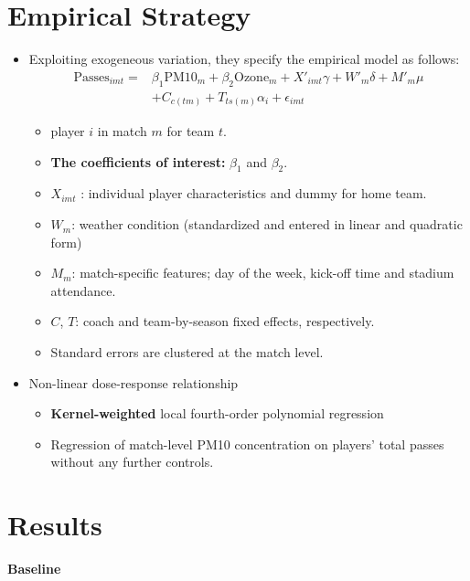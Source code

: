 \documentclass[../root]{subfiles}
\begin{document}
    \section{Empirical Strategy}

    \begin{itemize}
      \item Exploiting exogeneous variation, they specify the empirical model as follows:
      \begin{align*}
        \text{Passes}_{imt} = & \beta_1 \text{PM10}_m + \beta_2 \text{Ozone}_m + X'_{imt}\gamma + W'_m \delta + M'_m \mu \\
        & + C_{c(tm)} + T_{ts(m)} \alpha_i + \epsilon_{imt}
      \end{align*}
      \begin{itemize}
        \item player $i$ in match $m$ for team $t$.
        \item \textbf{The coefficients of interest:} $\beta_1$ and $\beta_2$.
        \item $X_{imt}$ : individual player characteristics and dummy for home team.
        \item $W_m$: weather condition (standardized and entered in linear and quadratic form)
        \item $M_m$: match-specific features; day of the week, kick-off time and stadium attendance.
        \item $C$, $T$: coach and team-by-season fixed effects, respectively.
        \item Standard errors are clustered at the match level.
      \end{itemize}
      \item Non-linear dose-response relationship
      \begin{itemize}
        \item \textbf{Kernel-weighted} local fourth-order polynomial regression
        \item Regression of match-level PM10 concentration on players' total passes without any further controls.
      \end{itemize}
    \end{itemize}

    \section{Results}

    \textbf{Baseline}
\end{document}
